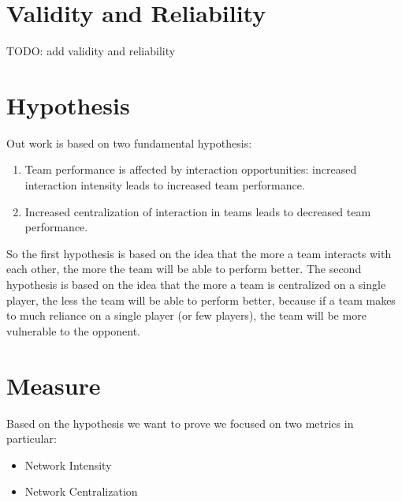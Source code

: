 \documentclass[12pt, a4paper]{article}
\begin{document}
\section{Validity and Reliability }
\label{validity-and-reliability}
TODO: add validity and reliability


\section{Hypothesis}
Out work is based on two fundamental hypothesis:
\begin{enumerate}
        \item Team performance is affected by interaction opportunities: increased interaction intensity leads to increased team performance.
        \item Increased centralization of interaction in teams leads to decreased team performance.
\end{enumerate}
So the first hypothesis is based on the idea that the more a team interacts with each other, the more the team will be able to perform better. The second hypothesis is based on the idea that the more a team is centralized on a single player, the less the team will be able to perform better, because if a team makes to much reliance on a single player (or few players), the team will be more vulnerable to the opponent. 
\section{Measure}
\label{measures}
Based on the hypothesis we want to prove we focused on two metrics in particular:
\begin{itemize}
        \item Network Intensity
        \item Network Centralization
\end{itemize}
\end{document}
